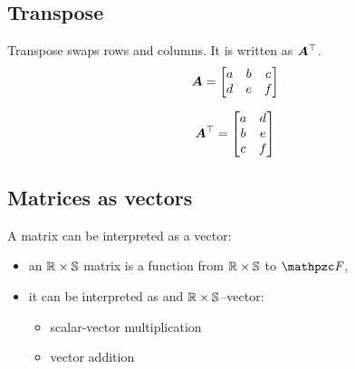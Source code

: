 \subsection{Transpose}
Transpose swaps rows and columns. It is written as ${\bm{A}}^{\top}$.
\begin{equation*}
  {\bm{A}} = 
  \begin{bmatrix}
    a & b & c \\
    d & e & f
  \end{bmatrix}
\end{equation*}

\begin{equation*}
  {\bm{A}}^{\top} = 
  \begin{bmatrix}
    a & d \\
    b & e \\
    c & f
  \end{bmatrix}
\end{equation*}

\subsection{Matrices as vectors}
A matrix can be interpreted as a vector:
\begin{itemize}
\item an ${\mathbb{R}} \times {\mathbb{S}}$ matrix is a function from ${\mathbb{R}} \times {\mathbb{S}}$ to $\fF$,
\item it can be interpreted as and ${\mathbb{R}} \times {\mathbb{S}}$--vector:
  \begin{itemize}
  \item scalar-vector multiplication
  \item vector addition
  \end{itemize}
\end{itemize}